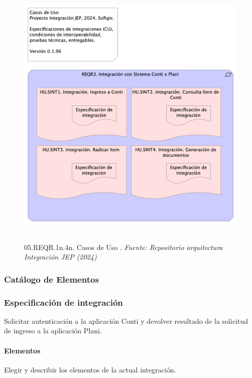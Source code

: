 \documentclass[
  paper=a4,
  ,captions=tableheading
]{scrartcl}
\begin{document}
\begin{figure}
\centering
\includegraphics[width=\textwidth,height=5.20833in]{images/05.REQR.1n.4n.CasosdeUso.png}
\caption{05.REQR.1n.4n. Casos de Uso . \emph{Fuente: Repositorio
arquitectura Integración JEP
(2024)}}\label{fig:id-eb0cac3ffa954ca0aa6a48e757b4d309}
\end{figure}

\subsubsection{Catálogo de
Elementos}\label{sec:catuxe1logo-de-elementos}

\subsubsection{Especificación de
integración}\label{sec:especificaciuxf3n-de-integraciuxf3n}

Solicitar autenticación a la aplicación Conti y devolver resultado de la
solicitud de ingreso a la aplicación Plani.

\paragraph{Elementos}\label{sec:elementos}

Elegir y describir los elementos de la actual integración.
\end{document}
